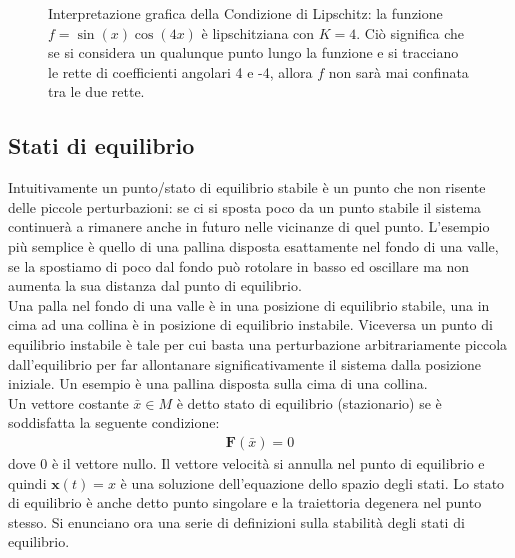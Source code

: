 \newpage

\begin{figure}[h!]
    \centering
    \caption{Interpretazione grafica della Condizione di Lipschitz: la funzione $f=\sin(x)\cos(4x)$ è lipschitziana con $K=4$. Ciò significa che se si considera un qualunque punto lungo la funzione e si tracciano le rette di coefficienti angolari 4 e -4, allora $f$ non sarà mai confinata tra le due rette.}
\end{figure}


\subsection{Stati di equilibrio} %
\label{sub:stabilità_degli_stati_di_equilibrio}
Intuitivamente un punto/stato di equilibrio stabile è un punto che non risente delle piccole perturbazioni: se ci si sposta poco da un punto stabile il sistema continuerà a rimanere anche in futuro nelle vicinanze di quel punto. L'esempio più semplice è quello di una pallina disposta esattamente nel fondo di una valle, se la spostiamo di poco dal fondo può rotolare in basso ed oscillare ma non aumenta la sua distanza dal punto di equilibrio.\\

Una palla nel fondo di una valle è in una posizione di equilibrio stabile, una in cima ad una collina è in posizione di equilibrio instabile. Viceversa un punto di equilibrio instabile è tale per cui basta una perturbazione arbitrariamente piccola dall'equilibrio per far allontanare significativamente il sistema dalla posizione iniziale. Un esempio è una pallina disposta sulla cima di una collina.\\

Un vettore costante $\bar{x}\in M$ è detto stato di equilibrio (stazionario) se è soddisfatta la seguente condizione:
\begin{align*}
    \mathbf{F}(\bar{x}) = 0
\end{align*}
dove 0 è il vettore nullo. Il vettore velocità si annulla nel punto di equilibrio e quindi $\mathbf{x}(t) = x$ è una soluzione dell'equazione dello spazio degli stati. Lo stato di equilibrio è anche detto punto singolare e la traiettoria degenera nel punto stesso. Si enunciano ora una serie di definizioni sulla stabilità degli stati di equilibrio.

